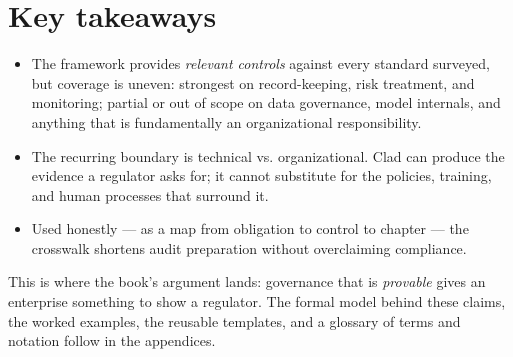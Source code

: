 \section{Key takeaways}


\begin{itemize}
  \item The framework provides \emph{relevant controls} against every standard surveyed, but coverage is uneven: strongest on record-keeping, risk treatment, and monitoring; partial or out of scope on data governance, model internals, and anything that is fundamentally an organizational responsibility.
  \item The recurring boundary is technical vs. organizational. Clad can produce the evidence a regulator asks for; it cannot substitute for the policies, training, and human processes that surround it.
  \item Used honestly --- as a map from obligation to control to chapter --- the crosswalk shortens audit preparation without overclaiming compliance.
\end{itemize}


This is where the book's argument lands: governance that is \emph{provable} gives an enterprise something to show a regulator. The formal model behind these claims, the worked examples, the reusable templates, and a glossary of terms and notation follow in the appendices.

